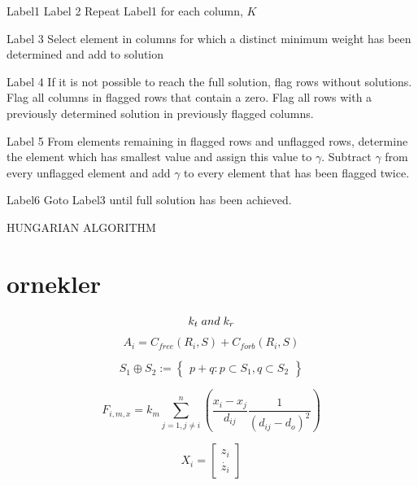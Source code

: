 \documentclass[twoside]{article}
\begin{document}
	\begin{algorithm}[H]
	
	     Label1  \;
	   Label 2  \; 
	   {Repeat Label1 for each column, $K$}
   
      Label 3  \; 
      Select element in columns for which a distinct minimum weight has been determined and add to solution
     
     Label 4 \;
     If it is not possible to reach the full solution, flag rows without solutions. Flag all columns in flagged rows that contain a zero. Flag all rows with a previously determined solution in previously flagged columns.
     
     Label 5 \;
     From elements remaining in flagged rows and unflagged rows, determine the element which has smallest value and assign this value to $\gamma$. Subtract $\gamma$  from every unflagged element and add  $\gamma$ to every element that has been flagged twice.
     
     Label6 \;
     Goto Label3 until full solution has been achieved.
     
     		\caption{HUNGARIAN ALGORITHM}
		\end{algorithm}
	
	
	
	
	
	
	
	
	
	
	
	
		
		\section{ornekler}
		
		\begin{equation}
 k_t  \hspace{0.1cm}and\hspace{0.1cm} k_r
		\end{equation}
			\begin{equation}
			A_i = C_{free}(R_i,S) + C_{forb}(R_i,S)
			\end{equation}	
			
			
			
			\begin{equation}
			S_1 \oplus S_2 := \begin{Bmatrix}
			p+q : p \subset S_1, q \subset S_2
			\end{Bmatrix} 
			\end{equation}
			
			\begin{equation}
			F_{i,m,x} = k_m \sum_{j=1, j\neq{i}}^{n}\left({\frac{x_i - x_j}{{d_{ij}}} \frac{1}{\left(d_{ij} - d_o \right)^2} } \right)
			\end{equation}
			
			\begin{equation}
			X_i= \begin{bmatrix}
			z_i\\
			\dot{z_i}
			\end{bmatrix}
			\end{equation}
	
		
	
\end{document}
